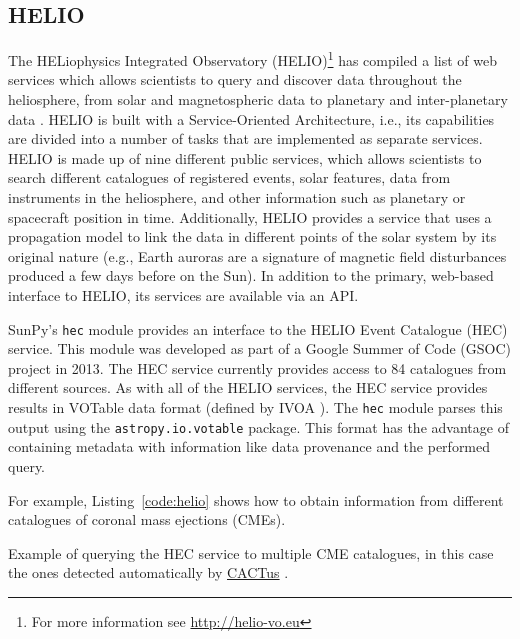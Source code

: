 \subsection{HELIO}\label{ssec:helio}

The HELiophysics Integrated Observatory (HELIO)\footnote{For more information 
see \url{http://helio-vo.eu}} has 
compiled a list of web services which allows scientists to query and 
discover data throughout the heliosphere, from solar and magnetospheric data to planetary and 
inter-planetary data \citep{dps2012}.
HELIO is built with a Service-Oriented Architecture, 
i.e., its capabilities are divided into a number of tasks that are 
implemented as separate services. 
HELIO is made up of nine different public services, 
which allows scientists to search different catalogues of registered events, 
solar features, data from instruments in the heliosphere, and other information 
such as planetary or spacecraft position in time. 
Additionally, HELIO provides a service that uses a 
propagation model to link the data in different points of the solar system by 
its original nature (e.g., Earth auroras are a signature of magnetic 
field disturbances produced a few days before on the Sun).
In addition to the primary, web-based interface to 
HELIO, its services are available via an API.

SunPy's \texttt{hec} module provides an interface to the
HELIO Event Catalogue (HEC) service. 
This module was developed as
part of a Google Summer of Code (GSOC) project in 2013.
The HEC service currently provides access to 84 catalogues from different
sources.
As with all of the HELIO services, the HEC service provides results in VOTable 
data format (defined by IVOA \cite{ochsenbein_ivoa_2011}).
The \texttt{hec} module parses this output using the \texttt{astropy.io.votable} package.
This format has the advantage of containing metadata with information like
data provenance and the performed query.

For example, Listing~\ref{code:helio} shows how to obtain information
from different catalogues of coronal mass ejections (CMEs).

\begin{listing}[h]
\caption{Example of querying the HEC service to multiple CME
catalogues, in this case the ones detected automatically 
by \href{http://sidc.oma.be/cactus/}{CACTus} \citep{robbrecht_automated_2009}.}
\label{code:helio}
\end{listing}